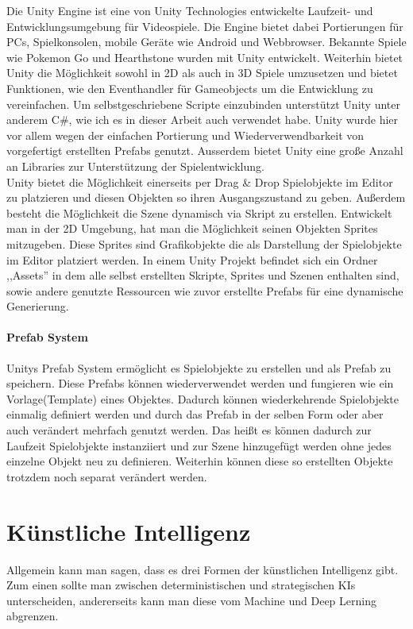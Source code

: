 Die Unity Engine ist eine von Unity Technologies entwickelte Laufzeit- und Entwicklungsumgebung für Videospiele. Die Engine bietet dabei Portierungen für PCs, Spielkonsolen, mobile Geräte wie Android und Webbrowser. Bekannte Spiele wie Pokemon Go und Hearthstone wurden mit Unity entwickelt. Weiterhin bietet Unity die Möglichkeit sowohl in 2D als auch in 3D Spiele umzusetzen und bietet Funktionen, wie den Eventhandler für Gameobjects um die Entwicklung zu vereinfachen. Um selbstgeschriebene Scripte einzubinden unterstützt Unity unter anderem C\#, wie ich es in dieser Arbeit auch verwendet habe. Unity wurde hier vor allem wegen der einfachen Portierung und Wiederverwendbarkeit von vorgefertigt erstellten Prefabs genutzt. Ausserdem bietet Unity eine große Anzahl an Libraries zur Unterstützung der Spielentwicklung. \\Unity bietet die Möglichkeit einerseits per Drag \& Drop Spielobjekte im Editor zu platzieren und diesen Objekten so ihren Ausgangszustand zu geben. Außerdem besteht die Möglichkeit die Szene dynamisch via Skript zu erstellen. Entwickelt man in der 2D Umgebung, hat man die Möglichkeit seinen Objekten Sprites mitzugeben. Diese Sprites sind Grafikobjekte die als Darstellung der Spielobjekte im Editor platziert werden. In einem Unity Projekt befindet sich ein Ordner ,,Assets'' in dem alle selbst erstellten Skripte, Sprites und Szenen enthalten sind, sowie andere genutzte Ressourcen wie zuvor erstellte Prefabs für eine dynamische Generierung.

\paragraph{Prefab System}
\nocite{UPrefabs}
Unitys Prefab System ermöglicht es Spielobjekte zu erstellen und als Prefab zu speichern. Diese Prefabs können wiederverwendet werden und fungieren wie ein Vorlage(Template) eines Objektes. Dadurch können wiederkehrende Spielobjekte einmalig definiert werden und durch das Prefab in der selben Form oder aber auch verändert mehrfach genutzt werden. Das heißt es können dadurch zur Laufzeit Spielobjekte instanziiert und zur Szene hinzugefügt werden ohne jedes einzelne Objekt neu zu definieren. Weiterhin können diese so erstellten Objekte trotzdem noch separat verändert werden.

\section{Künstliche Intelligenz}
\label{ch:Grundlagen:sec:Künstliche Intelligenz}
Allgemein kann man sagen, dass es drei Formen der künstlichen Intelligenz gibt. Zum einen sollte man zwischen deterministischen und strategischen KIs unterscheiden, andererseits kann man diese vom Machine und Deep Lerning abgrenzen.

